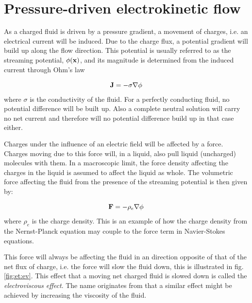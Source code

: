 \section{Pressure-driven electrokinetic flow}\label{sec:et:streaming_pot}
As a charged fluid is driven by a pressure gradient, a movement of
charges, i.e. an electrical current will be induced. Due to the charge
flux, a potential gradient will build up along the flow
direction. This potential is usually referred to as the streaming
potential, $\phi(\mathbf{x})$, and its magnitude is determined from the
induced current through Ohm's law

\begin{equation}
\mathbf{J} = -  \sigma \nabla \phi  
\end{equation}   
where $\sigma$ is the conductivity of the fluid. For a perfectly
conducting fluid, no potential difference will be built up. Also a
complete neutral solution will carry no net current and therefore will
no potential difference build up in that case either.

Charges under the influence of an electric field will be affected by a
force. Charges moving due to this force will, in a liquid, also pull
liquid (uncharged) molecules with them. In a macroscopic limit, the
force density affecting the charges in the liquid is assumed to affect
the liquid as whole. The volumetric force affecting the fluid from
the presence of the streaming potential is then given by:

\begin{equation}
\mathbf{F} = - \rho_e \nabla \phi
\end{equation}
where $\rho_e$ is the charge density. This is an example of how the
charge density from the Nernst-Planck equation may couple to the force
term in Navier-Stokes equations. 

This force will always be affecting the fluid in an direction opposite
of that of the net flux of charge, i.e. the force will slow the fluid
down, this is illustrated in fig. \ref{fig:et:ev}. This effect
that a moving net charged fluid is slowed down is called the
\emph{electroviscous effect}. The name originates from that a similar
effect might be achieved by increasing the viscosity of the fluid.

